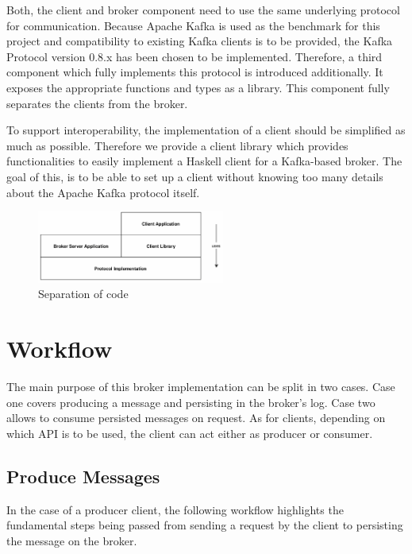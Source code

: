 Both, the client and broker component need to use the same underlying protocol
for communication. Because Apache Kafka is used as the benchmark for this project
and compatibility to existing Kafka clients is to be provided, the Kafka
Protocol version 0.8.x has been chosen to be implemented. Therefore, a third
component which fully implements this protocol is introduced additionally. It
exposes the appropriate functions and types as a library. This component fully
separates the clients from the broker. 

To support interoperability, the implementation of a client should be simplified
as much as possible. Therefore we provide a client library which provides functionalities to
easily implement a Haskell client for a Kafka-based broker. The goal of this, is to be able to
set up a client without knowing too many details about the Apache Kafka protocol
itself.

\begin{figure}[H]
    \centering
    \includegraphics[width=0.55\textwidth]{images/architecture-components.png}
    \caption{Separation of code}
    \label{fig:architecture-components.png}
\end{figure}

\section{Workflow}

The main purpose of this broker implementation can be split in two cases. Case
one covers producing a message and persisting in the broker's log. Case two
allows to consume persisted messages on request. As for clients, depending on
which API is to be used, the client can act either as producer or consumer.

\subsection{Produce Messages}

In the case of a producer client, the following workflow highlights the
fundamental steps being passed from sending a request by the client to
persisting the message on the broker.

